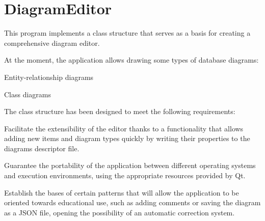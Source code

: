 \chapter{Diagram\+Editor }
\hypertarget{index}{}\label{index}
This program implements a class structure that serves as a basis for creating a comprehensive diagram editor.

At the moment, the application allows drawing some types of database diagrams:\+
\begin{DoxyItemize}
\item Entity-\/relationship diagrams
\item Class diagrams
\end{DoxyItemize}The class structure has been designed to meet the following requirements:\+
\begin{DoxyItemize}
\item Facilitate the extensibility of the editor thanks to a functionality that allows adding new items and diagram types quickly by writing their properties to the diagrams descriptor file.
\item Guarantee the portability of the application between different operating systems and execution environments, using the appropriate resources provided by Qt.
\item Establish the bases of certain patterns that will allow the application to be oriented towards educational use, such as adding comments or saving the diagram as a JSON file, opening the possibility of an automatic correction system.
\end{DoxyItemize}